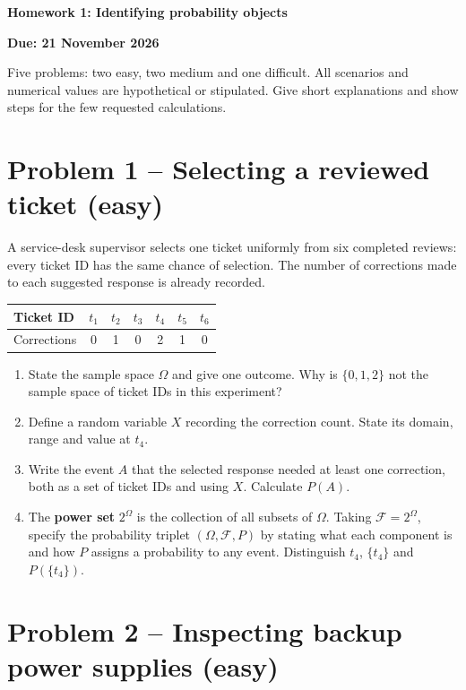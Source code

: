 \documentclass[11pt,a4paper]{article}
\begin{document}
{\Large\bfseries Homework 1: Identifying probability objects}
\par\textbf{Due: 21 November 2026}\par
Five problems: two easy, two medium and one difficult. All scenarios and numerical values are hypothetical or stipulated. Give short explanations and show steps for the few requested calculations.
\section*{Problem 1 -- Selecting a reviewed ticket (easy)}

A service-desk supervisor selects one ticket uniformly from six completed reviews: every ticket ID has the same chance of selection. The number of corrections made to each suggested response is already recorded.

\begin{center}\begin{tabular}{lcccccc}\toprule
Ticket ID & $t_1$ & $t_2$ & $t_3$ & $t_4$ & $t_5$ & $t_6$ \\
\midrule
Corrections & 0 & 1 & 0 & 2 & 1 & 0 \\
\bottomrule\end{tabular}\end{center}

\begin{enumerate}
\item State the sample space $\Omega$ and give one outcome. Why is $\{0,1,2\}$ not the sample space of ticket IDs in this experiment?
\item Define a random variable $X$ recording the correction count. State its domain, range and value at $t_4$.
\item Write the event $A$ that the selected response needed at least one correction, both as a set of ticket IDs and using $X$. Calculate $P(A)$.
\item The \textbf{power set} $2^\Omega$ is the collection of all subsets of $\Omega$. Taking $\mathcal F=2^\Omega$, specify the probability triplet $(\Omega,\mathcal F,P)$ by stating what each component is and how $P$ assigns a probability to any event. Distinguish $t_4$, $\{t_4\}$ and $P(\{t_4\})$.
\end{enumerate}

\section*{Problem 2 -- Inspecting backup power supplies (easy)}
\end{document}
